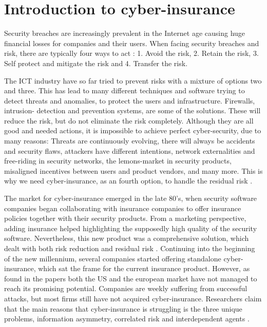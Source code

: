 \section{Introduction to cyber-insurance}
Security breaches are increasingly prevalent in the Internet age causing huge financial losses
for companies and their users. When facing security breaches and risk, there are typically four ways to act \cite{bolot:cyber}:
1. Avoid the risk, 2. Retain the risk, 3. Self protect and mitigate the risk and 4. Transfer the risk.

The ICT industry have so far tried to prevent risks with a mixture of options two and three. This has lead to many different techniques and software trying to detect threats and anomalies, to protect the users and infrastructure. Firewalls, intrusion- detection and prevention systems, are some of the solutions. These will reduce the risk, but do not eliminate the risk completely. Although they are all good and needed actions, it is impossible to achieve perfect cyber-security, due to many reasons: Threats are continuously evolving, there will always be accidents and security flaws, attackers have different intentions, network externalities and free-riding in security networks, the lemons-market in security products, misaligned incentives between users and product vendors, and many more. 
This is why we need cyber-insurance, as an fourth option, to handle the residual risk \cite{bolot:cyber2,ranjan:cyber}.

The market for cyber-insurance emerged in the late 80's, when security software companies began collaborating with insurance companies to offer insurance policies together with their security products. From a marketing perspective, adding insurance helped highlighting the supposedly high quality of the security software. Nevertheless, this new product was a comprehensive solution, which dealt with both risk reduction and residual risk \cite{bolot:new}. Continuing into the beginning of the new millennium, several companies started offering standalone cyber-insurance, which sat the frame for the current insurance product. However, as found in the papers \cite{ccost,evolvingcyber,CFCunder} both the US and the european market have not managed to reach its promising potential. Companies are weekly suffering from successful attacks, but most firms still have not acquired cyber-insurance. 
Researchers claim that the main reasons that cyber-insurance is struggling is the three unique problems, information asymmetry, correlated risk and interdependent agents \cite{bohme2010modeling}. 
